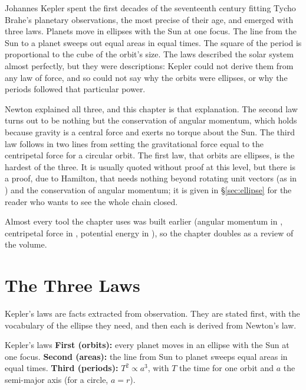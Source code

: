

Johannes Kepler spent the first decades of the seventeenth century fitting Tycho Brahe's planetary
observations, the most precise of their age, and emerged with three laws. Planets move in ellipses with the
Sun at one focus. The line from the Sun to a planet sweeps out equal areas in equal times. The square of the
period is proportional to the cube of the orbit's size. The laws described the solar system almost
perfectly, but they were descriptions: Kepler could not derive them from any law of force, and so could
not say why the orbits were ellipses, or why the periods followed that particular power.

Newton explained all three, and this chapter is that explanation. The second law turns out to be nothing
but the conservation of angular momentum, which holds because gravity is a central force and exerts no
torque about the Sun. The third law follows in two lines from setting the gravitational force equal to the
centripetal force for a circular orbit. The first law, that orbits are ellipses, is the hardest of the
three. It is usually quoted without proof at this level, but there is a proof, due to Hamilton, that needs
nothing beyond rotating unit vectors (as in ) and the conservation of angular momentum;
it is given in \S\ref{sec:ellipse} for the reader who wants to see the whole chain closed.

Almost every tool the chapter uses was built earlier (angular momentum in ,
centripetal force in , potential energy in ), so the chapter
doubles as a review of the volume.

\section{The Three Laws}

Kepler's laws are facts extracted from observation. They are stated first, with the vocabulary of the
ellipse they need, and then each is derived from Newton's law.

\begin{keybox}{Kepler's laws}
\textbf{First (orbits):} every planet moves in an ellipse with the Sun at one focus.
\textbf{Second (areas):} the line from Sun to planet sweeps equal areas in equal times.
\textbf{Third (periods):} $T^2\propto a^3$, with $T$ the time for one orbit and $a$ the semi-major axis
(for a circle, $a=r$).
\end{keybox}

